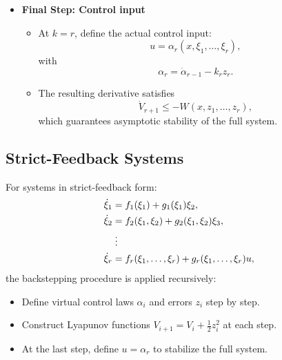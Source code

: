 \begin{itemize}
\item\textbf{Final Step: Control input}

\begin{itemize}
    \item At $k=r$, define the actual control input:
    \[
        u = \alpha_r(x, \xi_1, \dots, \xi_r),
    \]
    with
    \[
        \alpha_r = \dot{\alpha}_{r-1} - k_r z_r.
    \]
    \item The resulting derivative satisfies
    \[
        \dot{V}_{r+1} \leq - W(x, z_1, \dots, z_r),
    \]
    which guarantees asymptotic stability of the full system.
\end{itemize}
\end{itemize}

\subsection{Strict-Feedback Systems}

For systems in strict-feedback form:
\begin{align}
    \dot{\xi}_1 &= f_1(\xi_1) + g_1(\xi_1) \xi_2, \\
    \dot{\xi}_2 &= f_2(\xi_1, \xi_2) + g_2(\xi_1, \xi_2) \xi_3, \\
    &\;\vdots \notag\\
    \dot{\xi}_r &= f_r(\xi_1, \dots, \xi_r) + g_r(\xi_1, \dots, \xi_r) u,
\end{align}
the backstepping procedure is applied recursively:
\begin{itemize}
    \item Define virtual control laws $\alpha_i$ and errors $z_i$ step by step.
    \item Construct Lyapunov functions $V_{i+1} = V_i + \frac{1}{2} z_i^2$ at each step.
    \item At the last step, define $u = \alpha_r$ to stabilize the full system.
\end{itemize}

